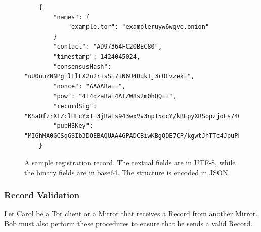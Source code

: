 \begin{figure}
	\begin{lstlisting}
	{
		"names": {
			"example.tor": "exampleruyw6wgve.onion"
		}
		"contact": "AD97364FC20BEC80",
		"timestamp": 1424045024,
		"consensusHash": "uU0nuZNNPgilLlLX2n2r+sSE7+N6U4DukIj3rOLvzek=",
		"nonce": "AAAABw==",
		"pow": "4I4dzaBwi4AIZW8s2m0hQQ==",
		"recordSig": 	"KSaOfzrXIZclHFcYxI+3jBwLs943wxVv3npI5ccY/kBEpyXRSopzjoFs746n0tJqUpdY4Kbe6DBwERaN7ELmSSK9Pu6q8QeKzNAh+QOnKl0fKBN7fqowjkQ3ktFkR0Vuox9WrrbNTMa4+up0Np52hlbKA3zSRz4fbR9NVlh6uuQ=",
		"pubHSKey": "MIGhMA0GCSqGSIb3DQEBAQUAA4GPADCBiwKBgQDE7CP/kgwtJhTTc4JpuPkvA7Ln9wgc+fgTKgkyUp1zusxgUAn1c1MGx4YhO42KPB7dyZOf3pcRk94XsYFY1ULkF2+tf9KdNe7GFzJyMFCQENnUcVXbcwLH4vAeiGK7R/nScbCbyc9LT+VE1fbKchTL1QzLVBLqJTxhR+9YPi8x+QIFAdZ8BJs="
	}
	\end{lstlisting}
	\caption{A sample registration record. The textual fields are in UTF-8, while the binary fields are in base64. The structure is encoded in JSON.}
	\label{fig:sampleRecord}
\end{figure}

\subsubsection{Record Validation}


Let Carol be a Tor client or a Mirror that receives a Record from another Mirror. Bob must also perform these procedures to ensure that he sends a valid Record.

